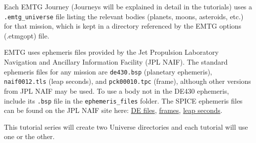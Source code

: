 \documentclass[11pt]{article}
\begin{document}
Each \ac{EMTG} Journey (Journeys will be explained in detail in the tutorials) uses a \texttt{.emtg\_universe} file listing the relevant bodies (planets, moons, asteroids, etc.) for that mission, which is kept in a directory referenced by the \ac{EMTG} options (.etmgopt) file.

\noindent \ac{EMTG} uses ephemeris files provided by the Jet Propulsion Laboratory Navigation and Ancillary Information Facility (JPL NAIF). The standard ephemeris files for any mission are \texttt{de430.bsp} (planetary ephemeris), \texttt{naif0012.tls} (leap seconds), and \texttt{pck00010.tpc} (frame), although other versions from JPL NAIF may be used. To use a body not in the DE430 ephemeris, include its \texttt{.bsp} file in the \texttt{ephemeris\_files} folder. The \ac{SPICE} ephemeris files can be found on the JPL NAIF site here: \href{https://naif.jpl.nasa.gov/pub/naif/generic_kernels/spk/planets/}{DE files}, \href{https://naif.jpl.nasa.gov/pub/naif/generic_kernels/pck/}{frames}, \href{https://naif.jpl.nasa.gov/pub/naif/generic_kernels/lsk/}{leap seconds}.

\noindent This tutorial series will create two Universe directories and each tutorial will use one or the other.
\end{document}
